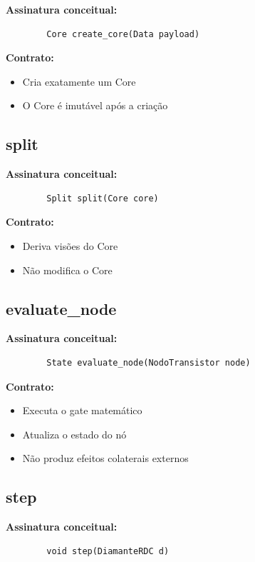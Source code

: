 \documentclass[12pt,a4paper]{article}
\begin{document}
	\textbf{Assinatura conceitual:}
	
	\begin{verbatim}
		Core create_core(Data payload)
	\end{verbatim}
	
	\textbf{Contrato:}
	\begin{itemize}
		\item Cria exatamente um Core
		\item O Core é imutável após a criação
	\end{itemize}
	
	\subsection{split}
	
	\textbf{Assinatura conceitual:}
	
	\begin{verbatim}
		Split split(Core core)
	\end{verbatim}
	
	\textbf{Contrato:}
	\begin{itemize}
		\item Deriva visões do Core
		\item Não modifica o Core
	\end{itemize}
	
	\subsection{evaluate\_node}
	
	\textbf{Assinatura conceitual:}
	
	\begin{verbatim}
		State evaluate_node(NodoTransistor node)
	\end{verbatim}
	
	\textbf{Contrato:}
	\begin{itemize}
		\item Executa o gate matemático
		\item Atualiza o estado do nó
		\item Não produz efeitos colaterais externos
	\end{itemize}
	
	\subsection{step}
	
	\textbf{Assinatura conceitual:}
	
	\begin{verbatim}
		void step(DiamanteRDC d)
	\end{verbatim}
	
\end{document}

